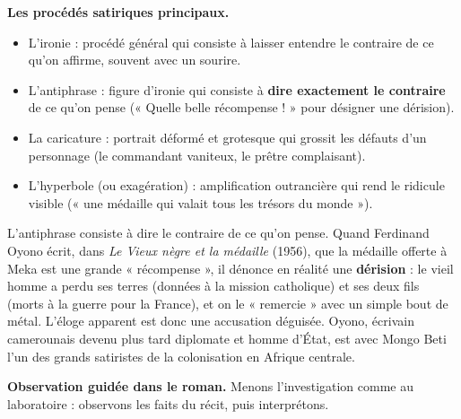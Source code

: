 \documentclass[11pt]{article}
\newcommand{\cle}[1]{{\popxbold\color{popdark}#1}}
\begin{document}
\textbf{Les procédés satiriques principaux.}

\begin{itemize}
\item L'\cle{ironie} : procédé général qui consiste à laisser entendre le contraire de ce qu'on affirme, souvent avec un sourire.
\item L'\cle{antiphrase} : figure d'ironie qui consiste à \textbf{dire exactement le contraire} de ce qu'on pense (« Quelle belle récompense ! » pour désigner une dérision).
\item La \cle{caricature} : portrait déformé et grotesque qui grossit les défauts d'un personnage (le commandant vaniteux, le prêtre complaisant).
\item L'\cle{hyperbole} (ou exagération) : amplification outrancière qui rend le ridicule visible (« une médaille qui valait tous les trésors du monde »).
\end{itemize}

\begin{savaistu}
L'\cle{antiphrase} consiste à dire le contraire de ce qu'on pense. Quand Ferdinand Oyono écrit, dans \emph{Le Vieux nègre et la médaille} (1956), que la médaille offerte à Meka est une grande « récompense », il dénonce en réalité une \textbf{dérision} : le vieil homme a perdu ses terres (données à la mission catholique) et ses deux fils (morts à la guerre pour la France), et on le « remercie » avec un simple bout de métal. L'éloge apparent est donc une accusation déguisée. Oyono, écrivain camerounais devenu plus tard diplomate et homme d'État, est avec Mongo Beti l'un des grands satiristes de la colonisation en Afrique centrale.
\end{savaistu}

\textbf{Observation guidée dans le roman.} Menons l'investigation comme au laboratoire : observons les faits du récit, puis interprétons.
\end{document}
